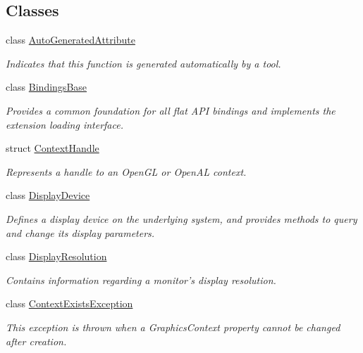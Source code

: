 \subsection*{Classes}
\begin{DoxyCompactItemize}
\item 
class \hyperlink{class_open_t_k_1_1_auto_generated_attribute}{Auto\-Generated\-Attribute}
\begin{DoxyCompactList}\small\item\em Indicates that this function is generated automatically by a tool. \end{DoxyCompactList}\item 
class \hyperlink{class_open_t_k_1_1_bindings_base}{Bindings\-Base}
\begin{DoxyCompactList}\small\item\em Provides a common foundation for all flat A\-P\-I bindings and implements the extension loading interface. \end{DoxyCompactList}\item 
struct \hyperlink{struct_open_t_k_1_1_context_handle}{Context\-Handle}
\begin{DoxyCompactList}\small\item\em Represents a handle to an Open\-G\-L or Open\-A\-L context. \end{DoxyCompactList}\item 
class \hyperlink{class_open_t_k_1_1_display_device}{Display\-Device}
\begin{DoxyCompactList}\small\item\em Defines a display device on the underlying system, and provides methods to query and change its display parameters. \end{DoxyCompactList}\item 
class \hyperlink{class_open_t_k_1_1_display_resolution}{Display\-Resolution}
\begin{DoxyCompactList}\small\item\em Contains information regarding a monitor's display resolution.\end{DoxyCompactList}\item 
class \hyperlink{class_open_t_k_1_1_context_exists_exception}{Context\-Exists\-Exception}
\begin{DoxyCompactList}\small\item\em This exception is thrown when a Graphics\-Context property cannot be changed after creation. \end{DoxyCompactList}\item 

\end{DoxyCompactItemize}
